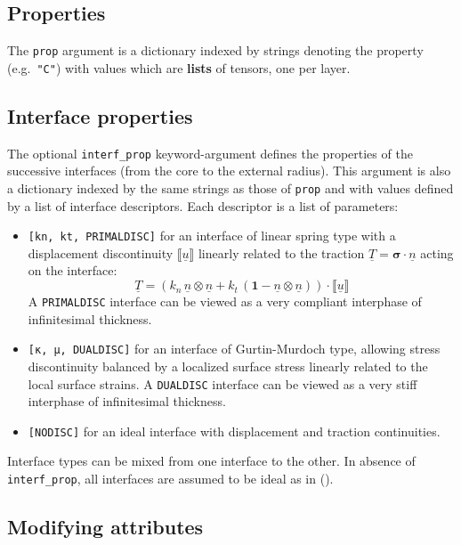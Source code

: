\documentclass[
  a4paper,
  numbers=noendperiod,
  DIV=12]{scrreprt}
\newcommand{\uu}[1]{{\symbf{{#1}}}}
\newcommand{\uv}[1]{{\underline{{#1}}}}
\newcommand{\n}{{\uv{{n}}}}
\newcommand{\sig}{{\uu{{\sigma}}}}
\newcommand{\jump}[1]{\llbracket #1 \rrbracket}
\begin{document}
\subsection{Properties}\label{properties}

The \texttt{prop} argument is a dictionary indexed by strings denoting
the property (e.g.~\texttt{"C"}) with values which are \textbf{lists} of
tensors, one per layer.

\subsection{Interface properties}\label{interface-properties}

The optional \texttt{interf\_prop} keyword-argument defines the
properties of the successive interfaces (from the core to the external
radius). This argument is also a dictionary indexed by the same strings
as those of \texttt{prop} and with values defined by a list of interface
descriptors. Each descriptor is a list of parameters:

\begin{itemize}
\item
  \texttt{{[}kn,\ kt,\ PRIMALDISC{]}} for an interface of linear spring
  type with a displacement discontinuity \(\jump{\uv{u}}\) linearly
  related to the traction \(\uv{T}=\sig\cdot\n\) acting on the
  interface:
  \[\uv{T}=\left(k_n \,\n\otimes\n + k_t \,(\uu{1}-\n\otimes\n)\right)\cdot\jump{\uv{u}}\]
  A \texttt{PRIMALDISC} interface can be viewed as a very compliant
  interphase of infinitesimal thickness.
\item
  \texttt{{[}κ,\ µ,\ DUALDISC{]}} for an interface of Gurtin-Murdoch
  type, allowing stress discontinuity balanced by a localized surface
  stress linearly related to the local surface strains. A
  \texttt{DUALDISC} interface can be viewed as a very stiff interphase
  of infinitesimal thickness.
\item
  \texttt{{[}NODISC{]}} for an ideal interface with displacement and
  traction continuities.
\end{itemize}

Interface types can be mixed from one interface to the other. In absence
of \texttt{interf\_prop}, all interfaces are assumed to be ideal as in
().

\subsection{Modifying attributes}\label{modifying-attributes}
\end{document}
